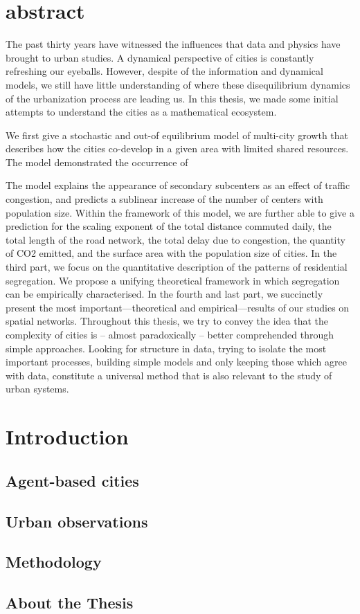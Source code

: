 \chapter*{abstract}

The past thirty years have witnessed the influences that data and physics have brought to urban studies. A dynamical perspective of cities is constantly refreshing our eyeballs. However, despite of the information and dynamical models, we still have little understanding of where these disequilibrium dynamics of the urbanization process are leading us. In this thesis, we made some initial attempts to understand the cities as a mathematical ecosystem.

We first give a stochastic and out-of equilibrium model of multi-city growth that describes how the cities co-develop in a given area with limited shared resources. The model demonstrated the occurrence of 

The model explains the appearance of secondary subcenters as an effect of traffic congestion, and predicts a sublinear increase of the number of centers with population size. Within the framework of this model, we are further able to give a prediction for the scaling exponent of the total distance commuted daily, the total length of the road network, the total delay due to congestion, the quantity of CO2 emitted, and the surface area with the population size of cities. In the third part, we focus on the quantitative description of the patterns of residential segregation. We propose a unifying theoretical framework in which segregation can be empirically characterised. In the fourth and last part, we succinctly present the most important---theoretical and empirical---results of our studies on spatial networks.
Throughout this thesis, we try to convey the idea that the complexity of cities is -- almost paradoxically -- better comprehended through simple approaches. Looking for structure in data, trying to isolate the most important processes, building simple models and only keeping those which agree with data, constitute a universal method that is also relevant to the study of urban systems.

\chapter{Introduction}


\section{Agent-based cities}




\section{Urban observations}




\section{Methodology}





\section{About the Thesis}